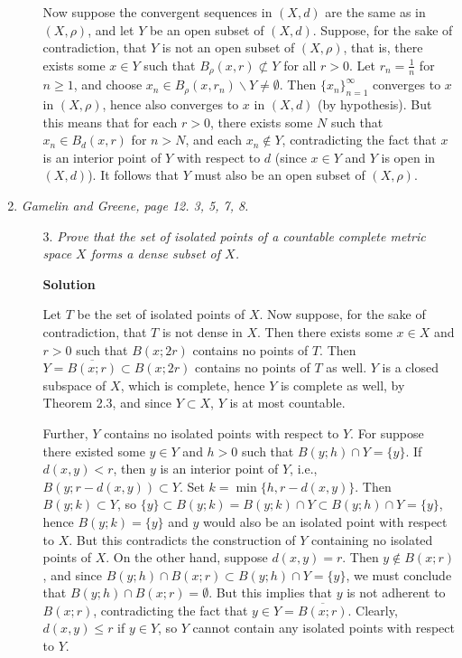 \documentclass{article}
\begin{document}
\begin{enumerate}
\begin{itemize}
Now suppose the convergent sequences in \((X,d)\) are the same as in \((X,\rho)\), and let \(Y\) be an open subset of \((X,d)\).  Suppose, for the sake of contradiction, that \(Y\) is not an open subset of \((X,\rho)\), that is, there exists some \(x \in Y\) such that \(B_{\rho}(x,r) \not\subset Y\) for all \(r > 0\).  Let \(r_n = \frac{1}{n}\) for \(n \geq 1\), and choose \(x_n \in B_{\rho}(x,r_n) \backslash Y \neq \emptyset\).  Then \(\{x_n\}_{n = 1}^{\infty}\) converges to \(x\) in \((X,\rho)\), hence also converges to \(x\) in \((X,d)\) (by hypothesis).  But this means that for each \(r > 0\), there exists some \(N\) such that \(x_n \in B_d(x,r)\) for \(n > N\), and each \(x_n \notin Y\), contradicting the fact that \(x\) is an interior point of \(Y\) with respect to \(d\) (since \(x \in Y\) and \(Y\) is open in \((X,d)\)).  It follows that \(Y\) must also be an open subset of \((X,\rho)\).



\end{itemize}

\item {\em Gamelin and Greene, page 12.  3, 5, 7, 8.}

\begin{itemize}

\item[3.] {\em Prove that the set of isolated points of a countable complete metric space \(X\) forms a dense subset of \(X\).}

{\bf Solution}

Let \(T\) be the set of isolated points of \(X\).  Now suppose, for the sake of contradiction, that \(T\) is not dense in \(X\).  Then there exists some \(x \in X\) and \(r > 0\) such that \(B(x;2r)\) contains no points of \(T\).  Then \(Y = \overline{B(x;r)} \subset B(x;2r)\) contains no points of \(T\) as well.  \(Y\) is a closed subspace of \(X\), which is complete, hence \(Y\) is complete as well, by Theorem 2.3, and since \(Y \subset X\), \(Y\) is at most countable.

Further, \(Y\) contains no isolated points with respect to \(Y\).  For suppose there existed some \(y \in Y\) and \(h > 0\) such that \(B(y;h) \cap Y = \{y\}\).  If \(d(x,y) < r\), then \(y\) is an interior point of \(Y\), i.e., \(B(y; r - d(x,y)) \subset Y\).  Set \(k = \min \{h, r - d(x,y)\}\).  Then \(B(y;k) \subset Y\), so \(\{y\} \subset B(y;k) = B(y;k) \cap Y \subset B(y;h) \cap Y = \{y\}\), hence \(B(y;k) = \{y\}\) and \(y\) would also be an isolated point with respect to \(X\).  But this contradicts the construction of \(Y\) containing no isolated points of \(X\).  On the other hand, suppose \(d(x,y) = r\).  Then \(y \notin B(x;r)\), and since \(B(y;h) \cap B(x;r) \subset B(y;h) \cap Y = \{y\}\), we must conclude that \(B(y;h) \cap B(x;r) = \emptyset\).  But this implies that \(y\) is not adherent to \(B(x;r)\), contradicting the fact that \(y \in Y = \overline{B(x;r)}\).  Clearly, \(d(x,y) \leq r\) if \(y \in Y\), so \(Y\) cannot contain any isolated points with respect to \(Y\).


\end{itemize}
\end{enumerate}
\end{document}
